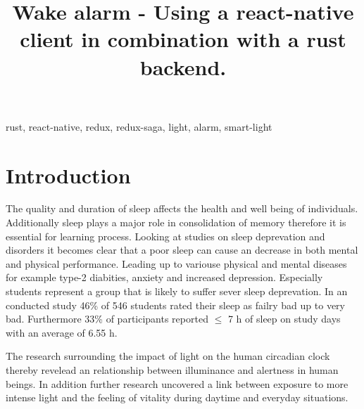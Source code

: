 \documentclass[conference]{IEEEtran}
\begin{document}
\title{Wake alarm - Using a react-native client in combination with a rust backend.}

\author{
\and
{}
}

\maketitle

\begin{abstract}


\end{abstract}

\begin{IEEEkeywords}
rust, react-native, redux, redux-saga, light, alarm, smart-light
\end{IEEEkeywords}

\section{Introduction}
The quality and duration of sleep affects the health and well being of individuals.
Additionally sleep plays a major role in consolidation of memory \cite{Rauchs2005} therefore it is essential for learning process.
Looking at studies on sleep deprevation and disorders it becomes clear that a poor sleep can cause an decrease in both
mental and physical performance. \cite{Mirghani2015a, Antunes2017a} Leading up to variouse physical and mental
diseases for example type-2 diabities, anxiety and increased depression. Especially students represent a group that 
is likely to suffer sever sleep deprevation. In an conducted study 46\% of 546 students rated their sleep as failry bad up to 
very bad. Furthermore 33\% of participants reported $\leq$ 7 h of sleep on study days with an average of 6.55 h. \cite{Norbury2019a}

The research surrounding the impact of light on the human circadian clock thereby revelead an relationship between illuminance and
alertness in human beings. \cite{DuffyJeanne2009a} In addition further research uncovered a link between exposure to more intense
light and the feeling of vitality during daytime and everyday situations. \cite{Smolders2014a}
\end{document}
